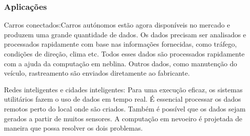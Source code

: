 \documentclass{llncs}
\begin{document}
\subsubsection{Aplicações}
Carros conectados:Carros autónomos estão agora disponíveis no mercado e produzem uma grande quantidade de dados. Os dados precisam ser analisados e processados rapidamente com base nas informações fornecidas, como tráfego, condições de direção, clima etc. Todos esses dados são processados rapidamente com a ajuda da computação em neblina. Outros dados, como manutenção do veículo, rastreamento são enviados diretamente ao fabricante.

Redes inteligentes e cidades inteligentes:
Para uma execução eficaz, os sistemas utilitários fazem o uso de dados em tempo real. É essencial processar os dados remotos perto do local onde são criados. Também é possível que os dados sejam gerados a partir de muitos sensores. A computação em nevoeiro é projetada de maneira que possa resolver os dois problemas. \cite{12}
\end{document}
